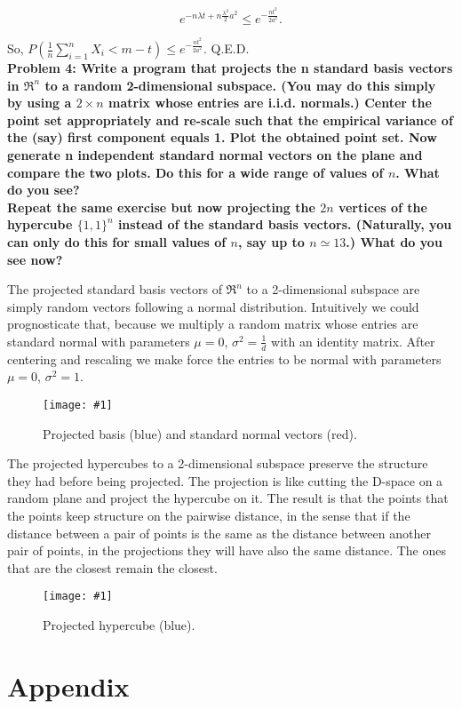 \documentclass[11pt, english]{article}
\newcommand{\grafico}[5]{
\begin{figure}
[h!tbp]
\centering
\texttt{[image: \#1]}
\caption{#4\label{#5}}
\end{figure}
}
\begin{document}
$$e^{-n\lambda t+n\frac{\lambda^2}{2}a^2}\leq e^{-\frac{nt^2}{2a^2}}.$$

So, $P\left(\frac{1}{n}\sum_{i=1}^nX_i<m-t\right)\leq e^{-\frac{nt^2}{2a^2}}$. Q.E.D.\\

\textbf{Problem 4: Write a program that projects the n standard basis vectors in $\Re^n$ to a random 2-dimensional subspace. (You may do this simply by using a $2\times n$ matrix whose entries are i.i.d. normals.) Center the point set appropriately and re-scale such that the empirical variance of the (say) first component equals 1. Plot the obtained point set. Now generate n independent standard normal vectors on the plane and compare the two plots. Do this for a wide range of values of $n$. What do you see?\\
Repeat the same exercise but now projecting the $2n$ vertices of the hypercube $\{1,1\}^n$ instead
of the standard basis vectors. (Naturally, you can only do this for small values of $n$, say up to $n\simeq 13$.) What do you see now?\\}

The projected standard basis vectors of $\Re^n$ to a 2-dimensional subspace are simply random vectors following a normal distribution. Intuitively we could prognosticate that, because we multiply a random matrix whose entries are standard normal with parameters $\mu=0$, $\sigma^2=\frac{1}{d}$ with an identity matrix. After centering and rescaling we make force the entries to be normal with parameters $\mu=0$, $\sigma^2=1$.


\grafico{Graphics/proj_basis.png}{0.4}{0}{Projected basis (blue) and standard normal vectors (red).}{basis}
\newpage
The projected hypercubes to a 2-dimensional subspace preserve the structure they had before being projected. The projection is like cutting the D-space on a random plane and project the hypercube on it. The result is that the points that the points keep structure on the pairwise distance, in the sense that if the distance between a pair of points is the same as the distance between another pair of points, in the projections they will have also the same distance. The ones that are the closest remain the closest. 


\grafico{Graphics/proj_hype.png}{0.8}{0}{Projected hypercube (blue).}{hypercube}

\newpage

\section{Appendix}
\end{document}
